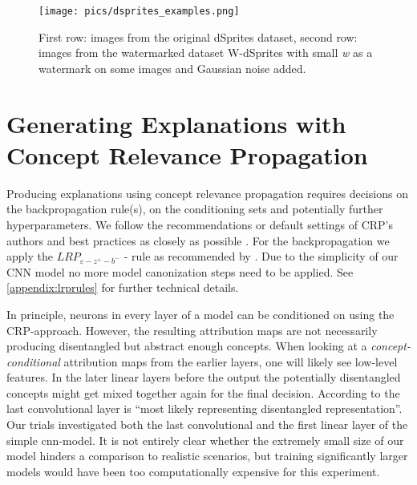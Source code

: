 \begin{figure}[H]
    \centering
    \texttt{[image: pics/dsprites\_examples.png]}
    \caption{First row: images from the original dSprites dataset, second row: images from the watermarked dataset W-dSprites with small \textit{w} as a watermark on some images and Gaussian noise added.}
    \label{fig:dsprites_examples}
\end{figure}

\section{Generating Explanations with Concept Relevance Propagation}
Producing explanations using concept relevance propagation requires decisions on the backpropagation rule(s), on the conditioning sets and potentially further hyperparameters. 
We follow the recommendations or default settings of CRP's authors \cite{Achtibat2022, Achtibat2023} and best practices \cite{Kohlbrenner2020} as closely as possible .
For the backpropagation we apply the $LRP_{\varepsilon -z^+- b^-}$ - rule as recommended by \cite{Kohlbrenner2020}. Due to the simplicity of our CNN model no more model canonization steps need to be applied. See \cref{appendix:lrprules} for further technical details. 

In principle, neurons in every layer of a model can be conditioned on using the CRP-approach. However, the resulting attribution maps are not necessarily producing disentangled but abstract enough concepts. When looking at a \textit{concept-conditional} attribution maps from the earlier layers, one will likely see low-level features. In the later linear layers before the output the potentially disentangled concepts might get mixed together again for the final decision. According to \cite{Dreyer2023a, Zeiler2013} the last convolutional layer is ``most likely representing disentangled representation''. Our trials investigated both the last convolutional and the first linear layer of the simple cnn-model. It is not entirely clear whether the extremely small size of our model hinders a comparison to realistic scenarios, but training significantly larger models would have been too computationally expensive for this experiment. 


